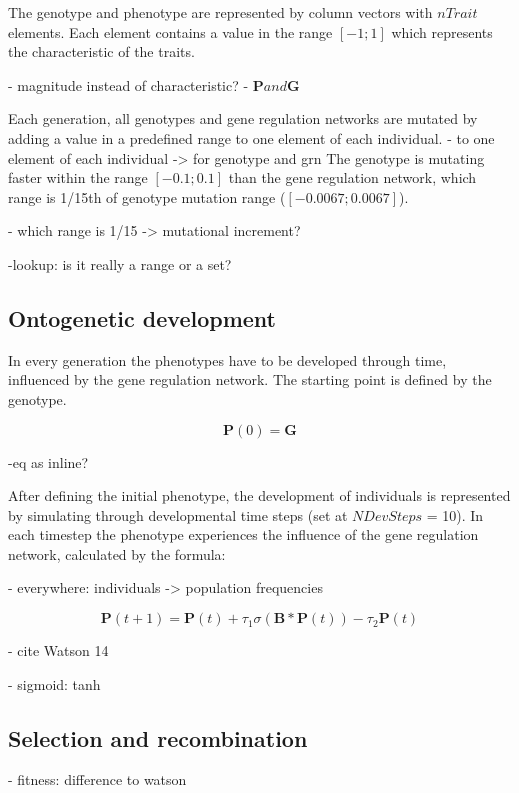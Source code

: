 \documentclass{article}
\begin{document}
The genotype and phenotype are represented by column vectors with $nTrait$ elements. Each element contains a value in the range $[-1; 1]$ which represents the characteristic of the traits.

- magnitude instead of characteristic?
- $\bm{P} and \bm{G}$

Each generation, all genotypes and gene regulation networks are mutated by adding a value in a predefined range to one element of each individual. 
- to one element of each individual -> for genotype and grn
The genotype is mutating faster within the range $[-0.1; 0.1]$ than the gene regulation network, which range is 1/15th of genotype mutation range ($[-0.0067; 0.0067]$).

- which range is 1/15 -> mutational increment?

-lookup: is it really a range or a set?

\subsection{Ontogenetic development}

In every generation the phenotypes have to be developed through time, influenced by the gene regulation network. The starting point is defined by the genotype.

\begin{equation}
	\bm{P}(0) = \bm{G}
\end{equation}

-eq as inline?

After defining the initial phenotype, the development of individuals is represented by simulating through developmental time steps (set at $NDevSteps$ = 10). In each timestep the phenotype experiences the influence of the gene regulation network, calculated by the formula:

- everywhere: individuals -> population frequencies

\begin{equation}
	\bm{P}(t+1) = \bm{P}(t) + \tau_1\sigma(\bm{B}*\bm{P}(t))-\tau_2\bm{P}(t)
\end{equation}

- cite Watson 14 

- sigmoid: tanh

\subsection{Selection and recombination}
- fitness: difference to watson
\end{document}
